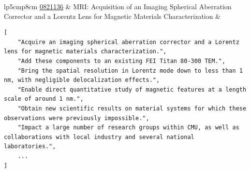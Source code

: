\documentclass[11pt]{article}
\begin{document}
\begin{table}[h]
\begin{tabular}{lp{5cm}p{8cm}}
         \href{https://www.nsf.gov/awardsearch/showAward?AWD_ID=0821136&HistoricalAwards=false}{0821136} & MRI: Acquisition of an Imaging Spherical Aberration Corrector and a Lorentz Lens for Magnetic Materials Characterization & \begin{minipage}{\linewidth}
\begin{lstlisting}
[
    "Acquire an imaging spherical aberration corrector and a Lorentz lens for magnetic materials characterization.",
    "Add these components to an existing FEI Titan 80-300 TEM.",
    "Bring the spatial resolution in Lorentz mode down to less than 1 nm, with negligible delocalization effects.",
    "Enable direct quantitative study of magnetic features at a length scale of around 1 nm.",
    "Obtain new scientific results on material systems for which these observations were previously impossible.",
    "Impact a large number of research groups within CMU, as well as collaborations with local industry and several national laboratories.",
    ...
]
\end{lstlisting}
\end{minipage} \\
    \bottomrule
    \end{tabular}
    \caption{A sample of extracted investigation proposals from the \DatasetNameMatSci~dataset. Award IDs are hyperlinked to the NSF's Award database.}
    \label{tab:ip-examples}
\end{table}
\end{document}
